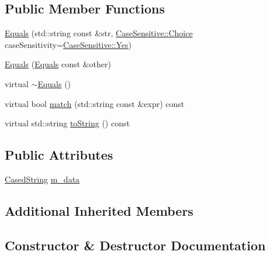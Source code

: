 \subsection*{Public Member Functions}
\begin{DoxyCompactItemize}
\item 
\hyperlink{struct_catch_1_1_matchers_1_1_impl_1_1_std_string_1_1_equals_a5921d5ed75320fb64a678e3f1292a464}{Equals} (std\+::string const \&str, \hyperlink{struct_catch_1_1_case_sensitive_aad49d3aee2d97066642fffa919685c6a}{Case\+Sensitive\+::\+Choice} case\+Sensitivity=\hyperlink{struct_catch_1_1_case_sensitive_aad49d3aee2d97066642fffa919685c6aa7c5550b69ec3c502e6f609b67f9613c6}{Case\+Sensitive\+::\+Yes})
\item 
\hyperlink{struct_catch_1_1_matchers_1_1_impl_1_1_std_string_1_1_equals_acaa97de06aedf363ae803d65a975f5e4}{Equals} (\hyperlink{struct_catch_1_1_matchers_1_1_impl_1_1_std_string_1_1_equals}{Equals} const \&other)
\item 
virtual \hyperlink{struct_catch_1_1_matchers_1_1_impl_1_1_std_string_1_1_equals_ad34af04f636ec84d7c613ead32f20c3f}{$\sim$\+Equals} ()
\item 
virtual bool \hyperlink{struct_catch_1_1_matchers_1_1_impl_1_1_std_string_1_1_equals_abf0a94b4e66dbd586268d9983f867e68}{match} (std\+::string const \&expr) const
\item 
virtual std\+::string \hyperlink{struct_catch_1_1_matchers_1_1_impl_1_1_std_string_1_1_equals_ab0d73961b95d9836d77b9e2e94c3790b}{to\+String} () const
\end{DoxyCompactItemize}
\subsection*{Public Attributes}
\begin{DoxyCompactItemize}
\item 
\hyperlink{struct_catch_1_1_matchers_1_1_impl_1_1_std_string_1_1_cased_string}{Cased\+String} \hyperlink{struct_catch_1_1_matchers_1_1_impl_1_1_std_string_1_1_equals_ae09964b7ba291ce574b514a2ee3eddb0}{m\+\_\+data}
\end{DoxyCompactItemize}
\subsection*{Additional Inherited Members}


\subsection{Constructor \& Destructor Documentation}
\hypertarget{struct_catch_1_1_matchers_1_1_impl_1_1_std_string_1_1_equals_a5921d5ed75320fb64a678e3f1292a464}{}\label{struct_catch_1_1_matchers_1_1_impl_1_1_std_string_1_1_equals_a5921d5ed75320fb64a678e3f1292a464} 
